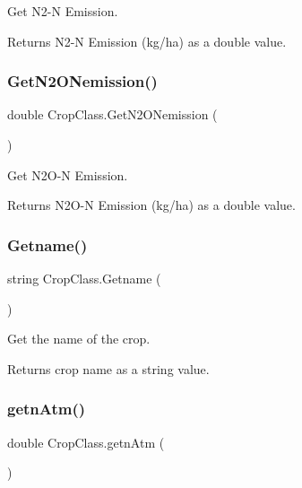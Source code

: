 Get N2-\/N Emission. 

\begin{DoxyReturn}{Returns}
N2-\/N Emission (kg/ha) as a double value. 
\end{DoxyReturn}
\mbox{\label{class_crop_class_ae582dbc59eafb0c86af12ae7ee7d5c8f}} 
\subsubsection{\texorpdfstring{GetN2ONemission()}{GetN2ONemission()}}
{\footnotesize\ttfamily double Crop\+Class.\+Get\+N2\+O\+Nemission (\begin{DoxyParamCaption}{ }\end{DoxyParamCaption})\hspace{0.3cm}{\ttfamily [inline]}}



Get N2\+O-\/N Emission. 

\begin{DoxyReturn}{Returns}
N2\+O-\/N Emission (kg/ha) as a double value. 
\end{DoxyReturn}
\mbox{\label{class_crop_class_a84905f5c6057de9d1eb2c1b6ff29d69d}} 
\subsubsection{\texorpdfstring{Getname()}{Getname()}}
{\footnotesize\ttfamily string Crop\+Class.\+Getname (\begin{DoxyParamCaption}{ }\end{DoxyParamCaption})\hspace{0.3cm}{\ttfamily [inline]}}



Get the name of the crop. 

\begin{DoxyReturn}{Returns}
crop name as a string value. 
\end{DoxyReturn}
\mbox{\label{class_crop_class_a917149eeb182c83f27ca4d028a660204}} 
\subsubsection{\texorpdfstring{getnAtm()}{getnAtm()}}
{\footnotesize\ttfamily double Crop\+Class.\+getn\+Atm (\begin{DoxyParamCaption}{ }\end{DoxyParamCaption})\hspace{0.3cm}{\ttfamily [inline]}}



